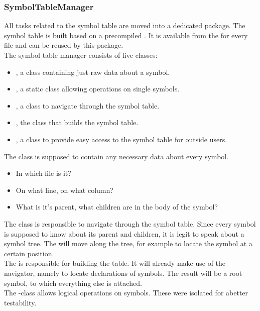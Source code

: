\subsubsection{SymbolTableManager}
All tasks related to the symbol table are moved into a dedicated package.
The symbol table is built based on a precompiled .
It is available from the  for every file and can be reused by this package.\\

The symbol table manager consists of five classes:
\begin{itemize}
    \item {}, a class containing just raw data about a symbol.
    \item {}, a static class allowing operations on single symbols.
    \item {}, a class to navigate through the symbol table.
    \item {}, the class that builds the symbol table.
    \item {}, a class to provide easy access to the symbol table for outside users.
\end{itemize}

The class  is supposed to contain any necessary data about every symbol.
\begin{itemize}
    \item In which file is it?
    \item On what line, on what column?
    \item What is it's parent, what children are in the body of the symbol?
\end{itemize}

The class  is responsible to navigate through the symbol table.
Since every symbol is supposed to know about its parent and children, it is legit to speak about a symbol tree.
The  will move along the tree, for example to locate the symbol at a certain position.\\

The  is responsible for building the table.
It will already make use of the navigator, namely to locate declarations of symbols.
The result will be a root symbol, to which everything else is attached.\\

The -class allows logical operations on symbols.
These were isolated for abetter testability.\\

